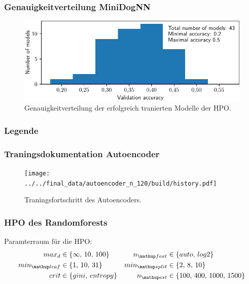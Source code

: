 \subsubsection{Genauigkeitverteilung MiniDogNN}
\FloatBarrier
\begin{figure}
\centering
\includegraphics[width=\the\textwidth]{../../final_data/MiniNN_n5/acc_hist.pdf}
\caption{Genauigkeitverteilung der erfolgreich tranierten Modelle der HPO.}
\label{fig:Genauigkeitverteilung_MiniDogNN}
\end{figure}
\subsubsection{Legende}

\FloatBarrier
\subsubsection{Traningsdokumentation Autoencoder}
\FloatBarrier
\begin{figure}
\centering
\centering
\texttt{[image: ../../final\_data/autoencoder\_n\_120/build/history.pdf]}
\caption{Traningsfortschritt des Autoencoders.}
\label{fig:Autoencoder_loss}
\end{figure}
\FloatBarrier

\subsubsection{HPO des Randomforests}
\FloatBarrier
Paramterraum für die HPO:
\begin{align}
  \begin{aligned}
    \label{eq: rf_parameter_raum}
    max_d &\in \left\{\infty,\, 10,\, 100\right\} & n\ua{feat}&\in\left\{auto, \,log2\right\}\\
    min\ua{leaf} &\in \left\{1,\, 10,\, 31\right\} & min\ua{split}&\in\left\{2,\, 8,\, 10\right\}\\
    crit &\in \left\{gini,\, entropy\right\} & n\ua{est}&\in\left\{100,\, 400,\, 1000,\, 1500 \right\}
  \end{aligned}
\end{align}
\FloatBarrier
